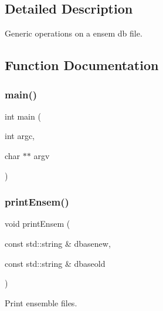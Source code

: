 \subsection{Detailed Description}
Generic operations on a ensem db file. 



\subsection{Function Documentation}
\mbox{\label{adat-devel_2main_2dbutil_2dbgraph__convert_8cc_a3c04138a5bfe5d72780bb7e82a18e627}} 
\subsubsection{\texorpdfstring{main()}{main()}}
{\footnotesize\ttfamily int main (\begin{DoxyParamCaption}\item[{int}]{argc,  }\item[{char $\ast$$\ast$}]{argv }\end{DoxyParamCaption})}

\mbox{\label{adat-devel_2main_2dbutil_2dbgraph__convert_8cc_a6fc5db26f2d2594d2601479adfa9dc32}} 
\subsubsection{\texorpdfstring{printEnsem()}{printEnsem()}}
{\footnotesize\ttfamily void print\+Ensem (\begin{DoxyParamCaption}\item[{const std\+::string \&}]{dbasenew,  }\item[{const std\+::string \&}]{dbaseold }\end{DoxyParamCaption})}



Print ensemble files. 

